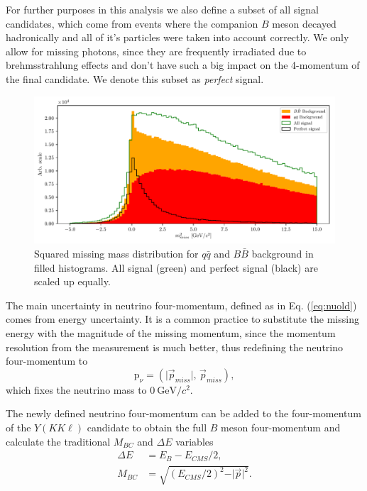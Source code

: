 \documentclass[  headings=standardclasses,
  headings=big,oneside,a4paper,openany,12pt]{scrbook}
\newcommand {\e}[1]{\mathrm{~#1}}
\begin{document}
For further purposes in this analysis we also define a subset of all signal candidates, which come from events where the companion $B$ meson decayed hadronically and all of it's particles were taken into account correctly. We only allow for missing photons, since they are frequently irradiated due to brehmsstrahlung effects and don't have such a big impact on the 4-momentum of the final candidate. We denote this subset as \textit{perfect} signal.

\begin{figure}[H]
\centering
\captionsetup{width=.8\linewidth}
\includegraphics[width=\linewidth]{fig/missM2}
\caption{Squared missing mass distribution for $q \bar q$ and $B \bar B$ background in filled histograms. All signal (green) and perfect signal (black) are scaled up equally.}
\label{fig:missm2}
\end{figure}

The main uncertainty in neutrino four-momentum, defined as in Eq. (\ref{eq:nuold}) comes from energy uncertainty. It is a common practice to substitute the missing energy with the magnitude of the missing momentum, since the momentum resolution from the measurement is much better, thus redefining the neutrino four-momentum to
\begin{equation}
\label{eq:nunew}
\mathrm{p}_\nu = \left(\vert \vec{p}_{miss} \vert,\,\vec{p}_{miss} \right),
\end{equation}
which fixes the neutrino mass to $0\e{GeV}/c^2$.

The newly defined neutrino four-momentum can be added to the four-momentum of the $Y(KK\ell)$ candidate to obtain the full $B$ meson four-momentum and calculate the traditional $M_{BC}$ and $\Delta E$ variables
\begin{align}
\label{eq:de}
\Delta E &= E_B - E_{CMS}/2,\\
M_{BC} &= \sqrt{\left(E_{CMS}/2\right)^2 - \vert \vec{p} \vert^2}.
\end{align}
\end{document}
